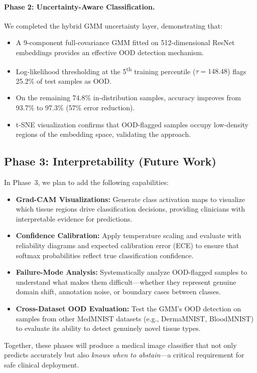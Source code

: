 \documentclass{article}
\begin{document}
\paragraph{Phase 2: Uncertainty-Aware Classification.}
We completed the hybrid GMM uncertainty layer, demonstrating that:
\begin{itemize}
    \item A 9-component full-covariance GMM fitted on 512-dimensional ResNet embeddings provides an effective OOD detection mechanism.
    \item Log-likelihood thresholding at the 5\textsuperscript{th} training percentile ($\tau = 148.48$) flags 25.2\% of test samples as OOD.
    \item On the remaining 74.8\% in-distribution samples, accuracy improves from 93.7\% to 97.3\% (57\% error reduction).
    \item t-SNE visualization confirms that OOD-flagged samples occupy low-density regions of the embedding space, validating the approach.
\end{itemize}

\subsection{Phase 3: Interpretability (Future Work)}

In Phase~3, we plan to add the following capabilities:

\begin{itemize}
    \item \textbf{Grad-CAM Visualizations:} Generate class activation maps to visualize which tissue regions drive classification decisions, providing clinicians with interpretable evidence for predictions.
    \item \textbf{Confidence Calibration:} Apply temperature scaling and evaluate with reliability diagrams and expected calibration error (ECE) to ensure that softmax probabilities reflect true classification confidence.
    \item \textbf{Failure-Mode Analysis:} Systematically analyze OOD-flagged samples to understand what makes them difficult---whether they represent genuine domain shift, annotation noise, or boundary cases between classes.
    \item \textbf{Cross-Dataset OOD Evaluation:} Test the GMM's OOD detection on samples from other MedMNIST datasets (e.g., DermaMNIST, BloodMNIST) to evaluate its ability to detect genuinely novel tissue types.
\end{itemize}

Together, these phases will produce a medical image classifier that not only predicts accurately but also \emph{knows when to abstain}---a critical requirement for safe clinical deployment.



\end{document}

